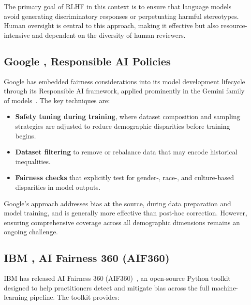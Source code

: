 The primary goal of RLHF in this context is to ensure that language models
avoid generating discriminatory responses or perpetuating harmful stereotypes.
Human oversight is central to this approach, making it effective but also
resource-intensive and dependent on the diversity of human reviewers.

\subsection{Google ,  Responsible AI Policies}

Google has embedded fairness considerations into its model development
lifecycle through its Responsible AI framework, applied prominently in the
Gemini family of models~\cite{gemini2023}.
The key techniques are:

\begin{itemize}[leftmargin=2em]
    \item \textbf{Safety tuning during training}, where dataset composition and
          sampling strategies are adjusted to reduce demographic disparities
          before training begins.
    \item \textbf{Dataset filtering} to remove or rebalance data that may
          encode historical inequalities.
    \item \textbf{Fairness checks} that explicitly test for gender-, race-, and
          culture-based disparities in model outputs.
\end{itemize}

Google's approach addresses bias at the source, during data preparation and
model training, and is generally more effective than post-hoc correction.
However, ensuring comprehensive coverage across all demographic dimensions
remains an ongoing challenge.

\subsection{IBM ,  AI Fairness 360 (AIF360)}

IBM has released AI Fairness 360 (AIF360)~\cite{aif360}, an open-source Python
toolkit designed to help practitioners detect and mitigate bias across the full
machine-learning pipeline.
The toolkit provides:

